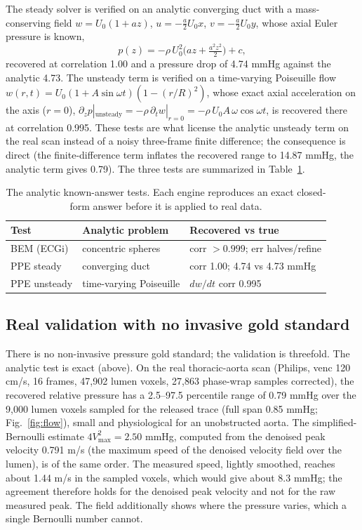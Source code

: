 \documentclass[journal]{IEEEtran}
\begin{document}
The steady solver is verified on an analytic converging duct with a mass-conserving field
$w=U_0(1+az)$, $u=-\tfrac{a}{2}U_0 x$, $v=-\tfrac{a}{2}U_0 y$, whose axial Euler pressure is
known,
\begin{equation}
p(z)=-\rho\,U_0^2\Big(az+\tfrac{a^2z^2}{2}\Big)+c,
\end{equation}
recovered at correlation 1.00 and a pressure drop of 4.74 mmHg against the analytic 4.73. The
unsteady term is verified on a time-varying Poiseuille flow
$w(r,t)=U_0(1+A\sin\omega t)(1-(r/R)^2)$, whose exact axial acceleration on the axis ($r=0$),
$\partial_z p|_\text{unsteady}=-\rho\,\partial_t w|_{r=0}=-\rho\,U_0 A\,\omega\cos\omega t$, is
recovered there at correlation 0.995. These tests are what license the analytic unsteady term on the real scan
instead of a noisy three-frame finite difference; the consequence is direct (the finite-difference
term inflates the recovered range to 14.87 mmHg, the analytic term gives 0.79). The three
tests are summarized in Table~\ref{tab:tests}.

\begin{table}[!t]
\caption{The analytic known-answer tests. Each engine reproduces an exact closed-form answer
before it is applied to real data.}
\label{tab:tests}
\centering
\setlength{\tabcolsep}{4pt}
\begin{tabular}{lll}
\toprule
Test & Analytic problem & Recovered vs true \\
\midrule
BEM (ECGi) & concentric spheres & corr $>0.999$; err halves/refine \\
PPE steady & converging duct & corr 1.00; 4.74 vs 4.73 mmHg \\
PPE unsteady & time-varying Poiseuille & $dw/dt$ corr 0.995 \\
\bottomrule
\end{tabular}
\end{table}

\subsection{Real validation with no invasive gold standard}

There is no non-invasive pressure gold standard; the validation is threefold. The analytic test
is exact (above). On the real thoracic-aorta scan (Philips, venc 120 cm/s, 16 frames, 47{,}902
lumen voxels, 27{,}863 phase-wrap samples corrected), the recovered relative pressure has a
2.5--97.5 percentile range of 0.79 mmHg over the 9{,}000 lumen voxels sampled for the released
trace (full span 0.85 mmHg; Fig.~\ref{fig:flow}), small and physiological for an unobstructed
aorta. The simplified-Bernoulli estimate $4V_\text{max}^2=2.50$ mmHg, computed from the
denoised peak velocity 0.791 m/s (the maximum speed of the denoised velocity field over the
lumen), is of the same order. The measured speed, lightly smoothed, reaches about 1.44 m/s in
the sampled voxels, which would give about 8.3 mmHg; the agreement therefore holds for the
denoised peak velocity and not for the raw measured peak. The field additionally shows where
the pressure varies, which a single Bernoulli number cannot.
\end{document}
